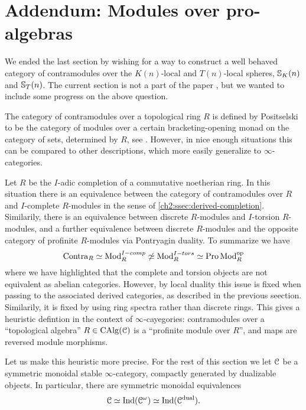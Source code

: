 
\section{Addendum: Modules over pro-algebras}

We ended the last section by wishing for a way to construct a well behaved category of contramodules over the $K(n)$-local and $T(n)$-local spheres, $\mathbb{S}_K(n)$ and $\mathbb{S}_T(n)$. The current section is not a part of the paper \cite{aambo_2024_positselski}, but we wanted to include some progress on the above question. 

The category of contramodules over a topological ring $R$ is defined by Positselski to be the category of modules over a certain bracketing-opening monad on the category of sets, determined by $R$, see \cite{positselski_2022_contramodules}. However, in nice enough situations this can be compared to other descriptions, which more easily generalize to $\infty$-categories. 

\begin{remark}
    \label{ch2:rm:contra-as-op-pro-modules}
    Let $R$ be the $I$-adic completion of a commutative noetherian ring. In this situation there is an equivalence between the category of contramodules over $R$ and $I$-complete $R$-modules in the sense of \cref{ch2:ssec:derived-completion}. Similarily, there is an equivalence between discrete $R$-modules and $I$-torsion $R$-modules, and a further equivalence between discrete $R$-modules and the opposite category of profinite $R$-modules via Pontryagin duality. To summarize we have  
    \[\mathrm{Contra}_R \simeq \mathrm{Mod}_R^{I-comp} \not\simeq \mathrm{Mod}_R^{I-tors}\simeq \operatorname{Pro}\mathrm{Mod}_R^{\mathrm{op}}\]
    where we have highlighted that the complete and torsion objects are not equivalent as abelian categories. However, by local duality this issue is fixed when passing to the associated derived categories, as described in the previous seection. Similarily, it is fixed by using ring spectra rather than discrete rings. This gives a heuristic defintion in the context of $\infty$-cayegories: contramodules over a ``topological algebra'' $R\in \operatorname{CAlg}(\EuScript{C})$ is a ``profinite module over $R$'', and maps are reversed module morphisms.  
\end{remark}

Let us make this heuristic more precise. For the rest of this section we let $\EuScript{C}$ be a symmetric monoidal stable $\infty$-category, compactly generated by dualizable objects. In particular, there are symmetric monoidal equivalences 
\[\EuScript{C} \simeq \operatorname{Ind}(\EuScript{C}^\omega) \simeq \operatorname{Ind}(\EuScript{C}^{\mathrm{dual}}).\]

